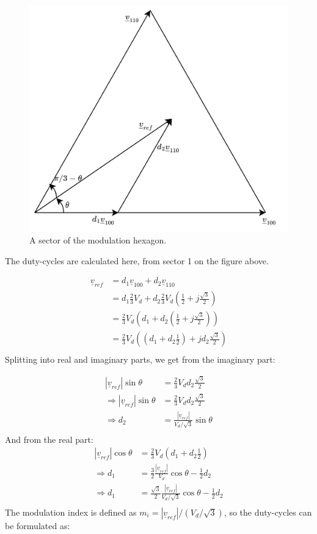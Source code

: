 \documentclass[]{book}
\begin{document}
\begin{figure}
\includegraphics[width=0.75\linewidth]{images/modulation/modulation-sector} \caption{A sector of the modulation hexagon.}\label{fig:unnamed-chunk-2}
\end{figure}

The duty-cycles are calculated here, from sector 1 on the figure above.

\[
\begin{aligned}
\underline{v}_{ref} &  = d_1 \underline{v}_{100} + d_2 \underline{v}_{110}\\
 &  = d_1 \frac{2}{3} V_d  + d_2 \frac{2}{3} V_d (\frac{1}{2}+j\frac{\sqrt{3}}{2})\\
 &  = \frac{2}{3} V_d ( d_1   + d_2  (\frac{1}{2}+j\frac{\sqrt{3}}{2}))\\
 &  = \frac{2}{3} V_d ( (d_1   + d_2  \frac{1}{2})+jd_2\frac{\sqrt{3}}{2})\\
\end{aligned}
\]
Splitting into real and imaginary parts, we get from the imaginary part:

\[
\begin{aligned}
 | \underline{v}_{ref}| \sin\theta  &  = \frac{2}{3} V_d d_2 \frac{\sqrt{3}}{2}\\
\Rightarrow | \underline{v}_{ref}| \sin\theta  &  = \frac{2}{3} V_d d_2 \frac{\sqrt{3}}{2}\\
\Rightarrow d_2  &  =  \frac{|\underline{v}_{ref}|}{V_d/\sqrt{3}} \sin\theta \\
\end{aligned}
\]
And from the real part:
\[
\begin{aligned}
| \underline{v}_{ref}| \cos\theta &  = \frac{2}{3} V_d ( d_1   + d_2  \frac{1}{2})\\
\Rightarrow  d_1  &  =  \frac{3}{2} \frac{|\underline{v}_{ref}|}{V_d}   \cos\theta  - \frac{1}{2}d_2\\
\Rightarrow  d_1  &  =  \frac{\sqrt{3}}{2} \frac{|\underline{v}_{ref}|}{V_d/\sqrt{3}}   \cos\theta  - \frac{1}{2}d_2\\
\end{aligned}
\]
The modulation index is defined as \(m_i=|\underline{v}_{ref}|/(V_d/\sqrt{3})\), so the duty-cycles can be formulated as:
\end{document}
